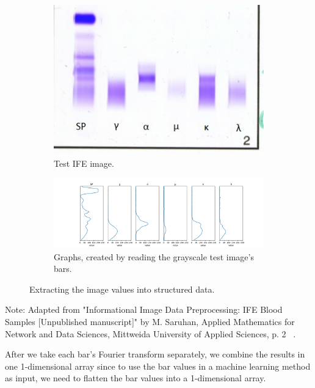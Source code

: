 \begin{figure}[H]
    \centering
\begin{subfigure}[!t]{0.8\textwidth}
\centering
\includegraphics[width=1\textwidth]{images/old imgs/IFE_names.jpg}
\caption{Test IFE image.}

\end{subfigure}
\begin{subfigure}[!b]{0.90\textwidth}
\centering
\includegraphics[width=1\textwidth]{images/old imgs/graph.png}
\caption{Graphs, created by reading the grayscale test image's bars.}

\end{subfigure}
    \caption{Extracting the image values into structured data.}
    \label{graphs}
\end{figure}

\noindent Note: Adapted from "Informational Image Data Preprocessing: IFE Blood Samples
[Unpublished manuscript]" by M. Saruhan, Applied Mathematics for Network and Data Sciences,
Mittweida University of Applied Sciences, p. 2 ~\cite{mypap}.
\vspace{10pt}

After we take each bar’s Fourier transform separately, we combine the results in one 1-dimensional array since to use the bar values in a machine learning method as input, we need to flatten the bar values into a 1-dimensional array.

